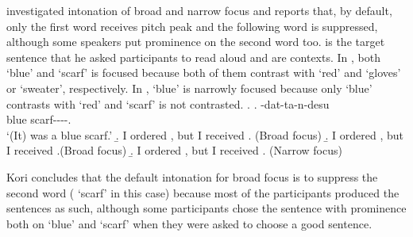 %
 investigated intonation of broad and narrow focus and
reports that, by default,
only the first word receives pitch peak and the following word is
suppressed,
although some speakers put prominence on the second word too.
\Next[a] is the target sentence that he asked participants to read aloud
and \Next[b-c] are contexts.
In \Next[b-c], both  `blue' and  `scarf' is focused
because both of them contrast with `red' and `gloves' or `sweater', respectively.
In \Next[d],  `blue' is narrowly focused
because only  `blue' contrasts with `red' and
`scarf' is not contrasted.
%
\ex.
 \ag.  -dat-ta-n-desu \\
      blue scarf----. \\
      `(It) was a blue scarf.'
 \b. I ordered , but I received . \hfill{(Broad focus)}
 \b. I ordered , but I received .\hfill{(Broad focus)}
 \b. I ordered , but I received . \hfill{(Narrow focus)}

Kori concludes that
the default intonation for broad focus is to suppress the second word ( `scarf' in this case)
because most of the participants produced the sentences as such,
although some participants chose the sentence with prominence both on  `blue' and  `scarf'
when they were asked to choose a good sentence.

